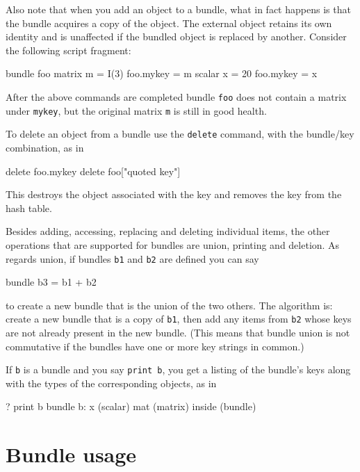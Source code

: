 Also note that when you add an object to a bundle, what in fact
happens is that the bundle acquires a copy of the object. The external
object retains its own identity and is unaffected if the bundled
object is replaced by another. Consider the following script fragment:

\begin{code}
bundle foo
matrix m = I(3)
foo.mykey = m
scalar x = 20
foo.mykey = x
\end{code}

After the above commands are completed bundle \texttt{foo} does not
contain a matrix under \texttt{mykey}, but the original matrix
\texttt{m} is still in good health.

To delete an object from a bundle use the \texttt{delete} command,
with the bundle/key combination, as in

\begin{code}
delete foo.mykey
delete foo["quoted key"]
\end{code}

This destroys the object associated with the key and removes the key
from the hash table.

Besides adding, accessing, replacing and deleting individual items,
the other operations that are supported for bundles are union,
printing and deletion. As regards union, if bundles \texttt{b1} and
\texttt{b2} are defined you can say

\begin{code}
bundle b3 = b1 + b2
\end{code}

to create a new bundle that is the union of the two others. The
algorithm is: create a new bundle that is a copy of \texttt{b1}, then
add any items from \texttt{b2} whose keys are not already present in
the new bundle. (This means that bundle union is not commutative if
the bundles have one or more key strings in common.)

If \texttt{b} is a bundle and you say \texttt{print b}, you get a
listing of the bundle's keys along with the types of the corresponding
objects, as in

\begin{code}
? print b
bundle b:
 x (scalar)
 mat (matrix)
 inside (bundle)
\end{code}

\section{Bundle usage}
\label{sec:bundle-usage}

